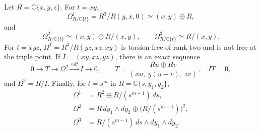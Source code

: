 \begin{lemma}\label{inv:A4.1}
Let $R=\mathbb C\{x,y,z\}$.  For $t=xy$,
\[
\Omega_{R/\mathbb C\{t\}}^1=R^3/R(y,x,0)
\simeq(x,y)\oplus R,
\]
and
\[
\Omega_{R/\mathbb C\{t\}}^2\simeq
(x,y)\oplus R/(x,y),\qquad
\Omega_{R/\mathbb C\{t\}}^3\simeq R/(x,y).
\]
For $t=xyz$,
$\Omega^1=R^3/R(yz,xz,xy)$ is torsion-free of rank two and is
not free at the triple point.  If $I=(xy,xz,yz)$, there is an exact
sequence
\[
0\to T\to\Omega^2\xrightarrow{\wedge dt} I\to0,
\qquad
T=\frac{R u\oplus R v}{(xu,\ y(u-v),\ zv)},
\quad IT=0,
\]
and $\Omega^3=R/I$.  Finally, for $t=s^m$ in
$R=\mathbb C\{s,y_1,y_2\}$,
\[
\begin{aligned}
\Omega^1&=R^2\oplus R/(s^{m-1})\,ds,\\
\Omega^2&=R\,dy_1\wedge dy_2
 \oplus\bigl(R/(s^{m-1})\bigr)^2,\\
\Omega^3&=R/(s^{m-1})\,ds\wedge dy_1\wedge dy_2.
\end{aligned}
\]
\end{lemma}

